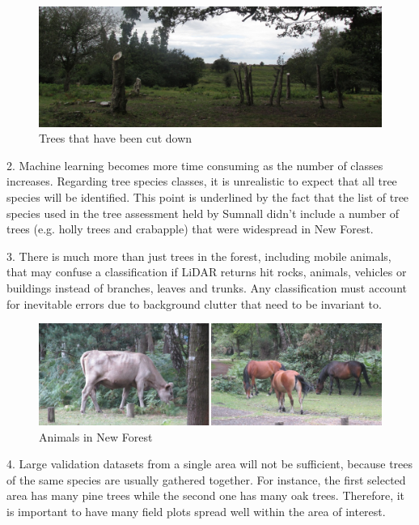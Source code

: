 \documentclass{subfiles}
\begin{document}
    \begin{figure} [!h]
    	\centering
    	\includegraphics[width=\textwidth]{img/NewForest/CC_TreesCutDown}
    	\caption{Trees that have been cut down}
    	\label{fig:CC_TreesCutDown}
    \end{figure}

    \par 2. Machine learning becomes more time consuming as the number of classes increases. Regarding tree species classes, it is unrealistic to expect that all tree species will be identified.  This point is underlined by the fact that the list of tree species used in the tree assessment held by Sumnall \cite{Sumnall2013} didn’t include a number of trees (e.g. holly trees and crabapple) that were widespread in New Forest. 
    
    \par 3.	There is much more than just trees in the forest, including mobile animals, that may confuse a classification if LiDAR returns hit rocks, animals, vehicles or buildings instead of branches, leaves and trunks. Any classification must account for inevitable errors due to background clutter that need to be invariant to. 
        \begin{figure} [!h]
        	\centering
        	\includegraphics[width=\textwidth]{img/NewForest/CC_Animals}
        	\caption{Animals in New Forest}
        	\label{fig:CC_Animals}
        \end{figure}
    
    \par 4.	Large validation datasets from a single area will not be sufficient, because trees of the same species are usually gathered together. For instance, the first selected area has many pine trees while the second one has many oak trees. Therefore, it is important to have many field plots spread well within the area of interest.  
    
\end{document}
